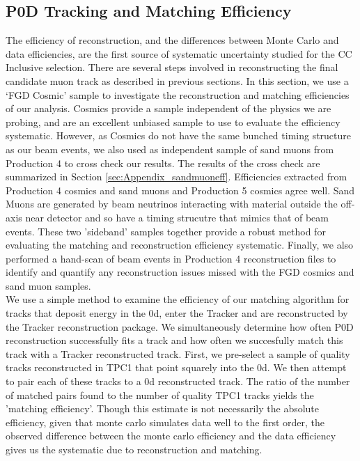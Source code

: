 \subsection{P0D Tracking and Matching Efficiency}
\label{sec:Systematics_Efficiency}

The efficiency of reconstruction, and the differences between Monte Carlo and data efficiencies, are the first source of systematic uncertainty studied for the CC Inclusive selection. There are several steps involved in reconstructing the final candidate muon track as described in previous sections. In this section, we use a `FGD Cosmic' sample to  investigate the reconstruction and matching efficiencies of our analysis. Cosmics provide a sample independent of the physics we are probing, and are an excellent unbiased sample to use to evaluate the efficiency systematic. However, as Cosmics do not have the same bunched timing structure as our beam events, we also used as independent sample of sand muons from Production 4 to cross check our results. The results of the cross check are summarized in Section \ref{sec:Appendix_sandmuoneff}. Efficiencies extracted from Production 4 cosmics and sand muons and Production 5 cosmics agree well.
Sand Muons are generated by beam neutrinos interacting with material outside the off-axis near detector and so have a timing strucutre that mimics that of beam events. 
These two 'sideband' samples together provide a robust method for evaluating the matching and reconstruction efficiency systematic. Finally, we also performed a hand-scan of beam events in Production 4 reconstruction files to identify and quantify any reconstruction issues missed with the FGD cosmics and sand muon samples.\\

We use a simple method to examine the efficiency of our matching algorithm for tracks that deposit energy in the \p0d, enter the Tracker and are reconstructed by the Tracker reconstruction package. We simultaneously determine how often P0D reconstruction successfully fits a track and how often we succesfully match this track with a Tracker reconstructed track. First, we pre-select a sample of quality tracks reconstructed in TPC1 that point squarely into the 
\p0d. We then attempt to pair each of these tracks to a \p0d reconstructed track. The ratio of the number of matched pairs found to the number of quality TPC1 tracks yields the 'matching efficiency'. Though this estimate is not necessarily the absolute efficiency, given that monte carlo simulates data well to the first order, the observed difference between the monte carlo efficiency and the data efficiency gives us the systematic due to reconstruction and matching.

